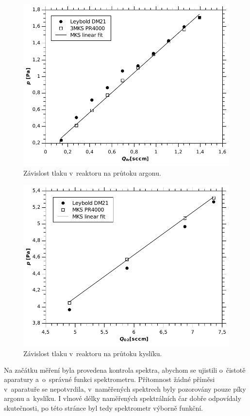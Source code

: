 \documentclass[12pt]{article}
\begin{document}
\begin{figure}[htbp]
\begin{center}
\includegraphics[width=12cm]{prutokar-img.pdf}
\caption{Závislost tlaku v~reaktoru na průtoku argonu.}
\label{prutokar-img}
\end{center}
\end{figure}

\begin{figure}[htbp]
\begin{center}
\includegraphics[width=12cm]{prutoko2-img.pdf}
\caption{Závislost tlaku v~reaktoru na průtoku kyslíku.}
\label{prutoko2-img}
\end{center}
\end{figure}



Na začátku měření byla provedena kontrola spektra, abychom se ujistili o~čistotě aparatury a~o~správné funkci spektrometru. Přítomnost žádné příměsi v~aparatuře se nepotvrdila, v~naměřených spektrech byly pozorovány pouze píky argonu a~kyslíku. I vlnové délky naměřených spektrálních čar dobře odpovídaly skutečnosti, po této stránce byl tedy spektrometr výborně funkční. 
\end{document}
